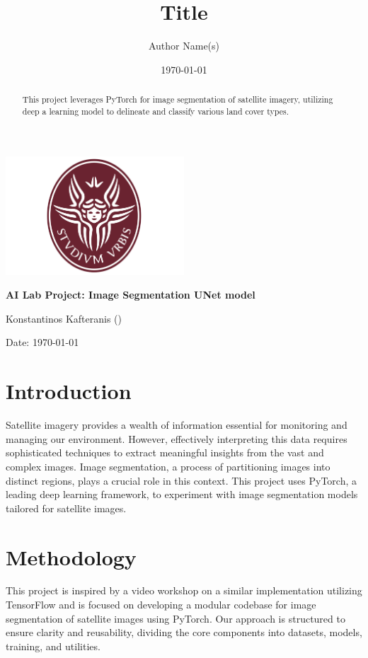 \documentclass{article}
\title{Title}
\author{Author Name(s)}
\date{\today}
\begin{document}
\begin{titlepage}
    \centering
    \includegraphics[width=0.5\textwidth]{../assets/sapienza_logo.png} 
    \vfill
    {\bfseries\Large
        AI Lab Project: Image Segmentation UNet model\par
    }
    \vfill
    {\Large
        Konstantinos Kafteranis ()\par
        
    }
    \vfill
    {\large
        Date: \today\par
    }
\end{titlepage}

\begin{abstract}
    This project leverages PyTorch for image segmentation of satellite imagery, utilizing deep a learning model to  delineate and classify various land cover types. \end{abstract}

\section{Introduction}
Satellite imagery provides a wealth of information essential for monitoring and managing our environment. However, effectively interpreting this data requires sophisticated techniques to extract meaningful insights from the vast and complex images. Image segmentation, a process of partitioning images into distinct regions, plays a crucial role in this context. This project uses PyTorch, a leading deep learning framework, to experiment with image segmentation models tailored for satellite images.

\section{Methodology}
This project is inspired by a video workshop on a similar implementation utilizing TensorFlow and is focused on developing a modular codebase for image segmentation of satellite images using PyTorch. Our approach is structured to ensure clarity and reusability, dividing the core components into datasets, models, training, and utilities.
\end{document}

